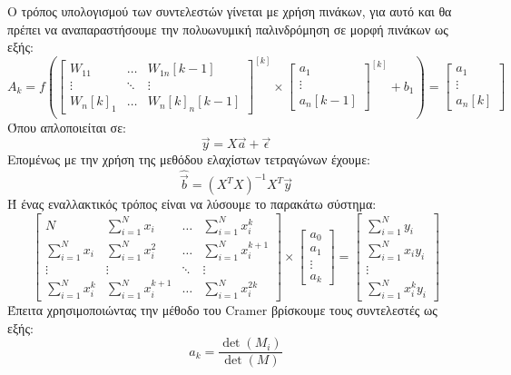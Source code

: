Ο τρόπος υπολογισμού των συντελεστών γίνεται με χρήση πινάκων, για αυτό και θα πρέπει
να αναπαραστήσουμε την πολυωνυμική παλινδρόμηση σε μορφή πινάκων ως εξής:
$$
A_k=f\left(
\begin{bmatrix}
    W_{11}     & \dots     & W_{1n}[k-1] \\
    \vdots     & \ddots    & \vdots \\
    W_n[k]_1   & \dots     & W_n[k]_n[k-1]
\end{bmatrix}
^{[k]}
\times
\begin{bmatrix}
    a_1 \\
    \vdots \\
    a_n[k-1]
\end{bmatrix}
^{[k]}
+b_1
\right)
=
\begin{bmatrix}
    a_1 \\
    \vdots \\
    a_n[k]
\end{bmatrix}
$$
Όπου απλοποιείται σε:
$$\overrightarrow{y}=X\overrightarrow{a}+\overrightarrow{\epsilon}$$
Επομένως με την χρήση της μεθόδου ελαχίστων τετραγώνων έχουμε:
$$\widehat{\overrightarrow{b}}=(X^TX)^{-1}X^T\overrightarrow{y}$$
Ή ένας εναλλακτικός τρόπος είναι να λύσουμε το παρακάτω σύστημα:
$$
\begin{bmatrix}
    N       & \sum\limits_{i=1}^Nx_i    & \dots     & \sum\limits_{i=1}^Nx_i^k \\
    \sum\limits_{i=1}^Nx_i   & \sum\limits_{i=1}^Nx_i^2       & \dots     & \sum\limits_{i=1}^Nx_i^{k+1} \\
    \vdots  & \vdots    & \ddots    & \vdots \\
    \sum\limits_{i=1}^Nx_i^k   & \sum\limits_{i=1}^Nx_i^{k+1}    & \dots     & \sum\limits_{i=1}^Nx_i^{2k}
\end{bmatrix}
\times
\begin{bmatrix}
    a_0 \\
    a_1 \\
    \vdots \\
    a_k
\end{bmatrix}
=
\begin{bmatrix}
    \sum\limits_{i=1}^Ny_i  \\
    \sum\limits_{i=1}^Nx_iy_i \\
    \vdots \\
    \sum\limits_{i=1}^Nx_i^ky_i
\end{bmatrix}
$$
Έπειτα χρησιμοποιώντας την μέθοδο του Cramer βρίσκουμε τους συντελεστές ως εξής:
$$a_k=\frac{\det (M_i)}{\det (M)}$$
\\
